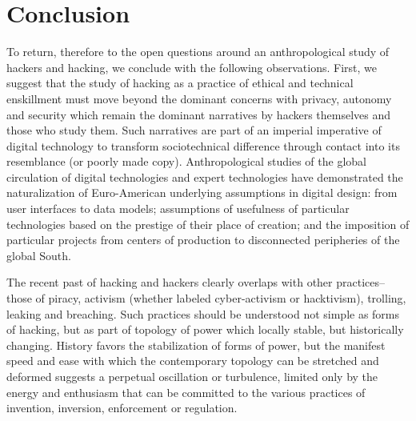 \documentclass[10pt,letter,oneside]{scrartcl}
\begin{document}
\section*{Conclusion}

To return, therefore to the open questions around an anthropological study of
hackers and hacking, we conclude with the following observations.  First, we
suggest that the study of hacking as a practice of ethical and technical
enskillment must move beyond the dominant concerns with privacy, autonomy and
security which remain the dominant narratives by hackers themselves and those
who study them.  Such narratives are part of an imperial imperative of digital
technology to transform sociotechnical difference through contact into its
resemblance (or poorly made copy).  Anthropological studies of the global
circulation of digital technologies and expert technologies have demonstrated
the naturalization of Euro-American underlying assumptions in digital design:
from user interfaces to data models; assumptions of usefulness of particular
technologies based on the prestige of their place of creation; and the
imposition of particular projects from centers of production to disconnected
peripheries of the global South.


The recent past of hacking and hackers clearly overlaps with other
practices--those of piracy, activism (whether labeled cyber-activism or
hacktivism), trolling, leaking and breaching.  Such practices should be
understood not simple as forms of hacking, but as part of topology of power
which locally stable, but historically changing.  History favors the
stabilization of forms of power, but the manifest speed and ease with which the
contemporary topology can be stretched and deformed suggests a perpetual
oscillation or turbulence, limited only by the energy and enthusiasm that can be
committed to the various practices of invention, inversion, enforcement or
regulation.

\end{document}
